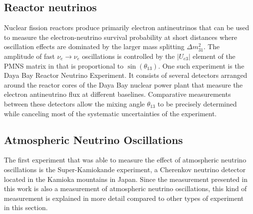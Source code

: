 \subsection{Reactor neutrinos}
Nuclear fission reactors produce primarily electron antineutrinos that can be used to measure the electron-neutrino survival probability at short distances where oscillation effects are dominated by the larger mass splitting $\Delta m^2_{31}$.
The amplitude of fast $\nu_e\rightarrow\nu_e$ oscillations is controlled by the $|U_{e3}|$ element of the PMNS matrix in  that is proportional to $\sin(\theta_{13})$.
One such experiment is the Daya Bay Reactor Neutrino Experiment\cite{DayaBay:2007fgu}.
It consists of several detectors arranged around the reactor cores of the Daya Bay nuclear power plant that measure the electron antineutrino flux at different baselines.
Comparative measurements between these detectors allow the mixing angle $\theta_{13}$ to be precisely determined while canceling most of the systematic uncertainties of the experiment.

\subsection{Atmospheric Neutrino Oscillations}
The first experiment that was able to measure the effect of atmospheric neutrino oscillations is the Super-Kamiokande experiment\cite{PhysRevLett.81.1562}, a Cherenkov neutrino detector located in the Kamioka mountains in Japan.
Since the measurement presented in this work is also a measurement of atmospheric neutrino oscillations, this kind of measurement is explained in more detail compared to other types of experiment in this section.

